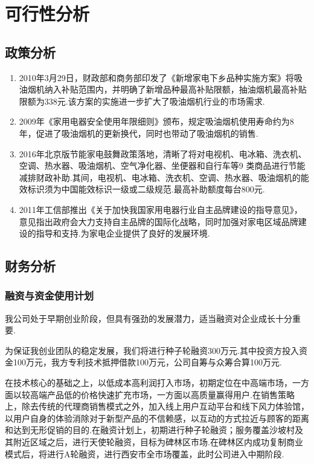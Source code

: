 ﻿\section{可行性分析}
\subsection{政策分析}
\begin{enumerate}
\item 2010年3月29日，财政部和商务部印发了《新增家电下乡品种实施方案》将吸油烟机纳入补贴范围内，并明确了新增品种最高补贴限额，抽油烟机最高补贴限额为338元.该方案的实施进一步扩大了吸油烟机行业的市场需求.
\item 2009年《家用电器安全使用年限细则》颁布，规定吸油烟机使用寿命约为8年，促进了吸油烟机的更新换代，同时也带动了吸油烟机的销售.
\item 2016年北京版节能家电鼓舞政策落地，清晰了将对电视机、电冰箱、洗衣机、空调、热水器、吸油烟机、空气净化器、坐便器和自行车等9 类商品进行节能减排财政补助.其间，电视机、电冰箱、洗衣机、空调、热水器、吸油烟机的能效标识须为中国能效标识一级或二级规范.最高补助额度每台800元.
\item 2011年工信部推出《关于加快我国家用电器行业自主品牌建设的指导意见》，意见指出政府会大力支持自主品牌的国际化战略，同时加强对家电区域品牌建设的指导和支持.为家电企业提供了良好的发展环境.
\end{enumerate}

\subsection{财务分析}
\subsubsection{融资与资金使用计划}
我公司处于早期创业阶段，但具有强劲的发展潜力，适当融资对企业成长十分重要.

为保证我创业团队的稳定发展，我们将进行种子轮融资300万元.其中投资方投入资金100万元，我方专利技术抵押借款100万元，公司自筹与众筹合算100万元.

在技术核心的基础之上，以低成本高利润打入市场，初期定位在中高端市场，一方面以较高端产品低的价格快速扩充市场，一方面以高质量赢得用户.在销售策略上，除去传统的代理商销售模式之外，加入线上用户互动平台和线下风力体验馆，以用户自身的体验消除对于新型产品的不信赖感，以互动的方式拉近与顾客的距离和达到无形促销的目的.在融资计划上，初期进行种子轮融资；服务覆盖沙坡村及其附近区域之后，进行天使轮融资，目标为碑林区市场.在碑林区内成功复制商业模式后，将进行A轮融资，进行西安市全市场覆盖，此时公司进入中期阶段.


